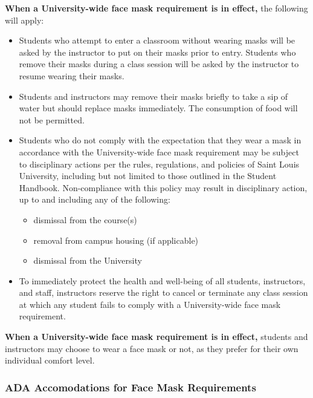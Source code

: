 \documentclass[
]{book}
\providecommand{\tightlist}{%
  \setlength{\itemsep}{0pt}\setlength{\parskip}{0pt}}
\begin{document}
\textbf{When a University-wide face mask requirement is in effect,} the following will apply:

\begin{itemize}
\tightlist
\item
  Students who attempt to enter a classroom without wearing masks will be asked by the instructor to put on their masks prior to entry. Students who remove their masks during a class session will be asked by the instructor to resume wearing their masks.
\item
  Students and instructors may remove their masks briefly to take a sip of water but should replace masks immediately. The consumption of food will not be permitted.
\item
  Students who do not comply with the expectation that they wear a mask in accordance with the University-wide face mask requirement may be subject to disciplinary actions per the rules, regulations, and policies of Saint Louis University, including but not limited to those outlined in the Student Handbook. Non-compliance with this policy may result in disciplinary action, up to and including any of the following:

  \begin{itemize}
  \tightlist
  \item
    dismissal from the course(s)
  \item
    removal from campus housing (if applicable)
  \item
    dismissal from the University
  \end{itemize}
\item
  To immediately protect the health and well-being of all students, instructors, and staff, instructors reserve the right to cancel or terminate any class session at which any student fails to comply with a University-wide face mask requirement.
\end{itemize}

\textbf{When a University-wide face mask requirement is in effect,} students and instructors may choose to wear a face mask or not, as they prefer for their own individual comfort level.

\hypertarget{ada-accomodations-for-face-mask-requirements}{%
\subsubsection{ADA Accomodations for Face Mask Requirements}\label{ada-accomodations-for-face-mask-requirements}}
\end{document}
